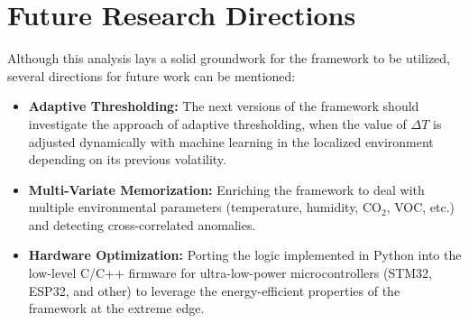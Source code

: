\section{Future Research Directions}
Although this analysis lays a solid groundwork for the framework to be utilized, several directions for future work can be mentioned:
\begin{itemize}
    \item \textbf{Adaptive Thresholding:} The next versions of the framework should investigate the approach of adaptive thresholding, when the value of $\Delta T$ is adjusted dynamically with machine learning in the localized environment depending on its previous volatility.
    \item \textbf{Multi-Variate Memorization:} Enriching the framework to deal with multiple environmental parameters (temperature, humidity, CO$_2$, VOC, etc.) and detecting cross-correlated anomalies.
    \item \textbf{Hardware Optimization:} Porting the logic implemented in Python into the low-level C/C++ firmware for ultra-low-power microcontrollers (STM32, ESP32, and other) to leverage the energy-efficient properties of the framework at the extreme edge.
\end{itemize}
